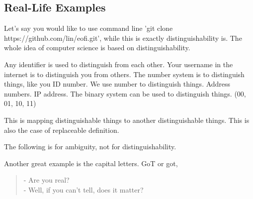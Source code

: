 \subsection*{Real-Life Examples}
Let's say you would like to use command line 'git clone https://github.com/lin/eofi.git', while this is exactly distinguishability is. The whole idea of computer science is based on distinguishability.

Any identifier is used to distinguish from each other. Your username in the internet is to distinguish you from others. The number system is to distinguish things, like you ID number. We use number to distinguish things. Address numbers. IP address. The binary system can be used to distinguish things. (00, 01, 10, 11)

This is mapping distinguishable things to another distinguishable things. This is also the case of replaceable definition.

The following is for ambiguity, not for distinguishability.

Another great example is the capital letters. GoT or got,

\begin{quote}
- Are you real? \\
- Well, if you can't tell, does it matter?
\end{quote}
